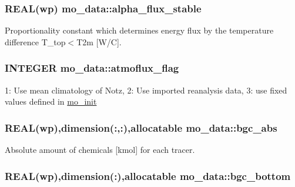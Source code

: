 \hypertarget{namespacemo__data_a5d103f2250083f57def04a08d89be231}{
\subsubsection[{alpha\_\-flux\_\-stable}]{\setlength{\rightskip}{0pt plus 5cm}REAL(wp) {\bf mo\_\-data::alpha\_\-flux\_\-stable}}}
\label{namespacemo__data_a5d103f2250083f57def04a08d89be231}


Proportionality constant which determines energy flux by the temperature difference T\_\-top$<$T2m \mbox{[}W/C\mbox{]}. 

\hypertarget{namespacemo__data_ac3bc82dac4d101806cd2a77f3b23d92c}{
\subsubsection[{atmoflux\_\-flag}]{\setlength{\rightskip}{0pt plus 5cm}INTEGER {\bf mo\_\-data::atmoflux\_\-flag}}}
\label{namespacemo__data_ac3bc82dac4d101806cd2a77f3b23d92c}


1: Use mean climatology of Notz, 2: Use imported reanalysis data, 3: use fixed values defined in \hyperlink{namespacemo__init}{mo\_\-init} 

\hypertarget{namespacemo__data_a0f5cfd95b789313c0a78a9b7feae167a}{
\subsubsection[{bgc\_\-abs}]{\setlength{\rightskip}{0pt plus 5cm}REAL(wp),dimension(:,:),allocatable {\bf mo\_\-data::bgc\_\-abs}}}
\label{namespacemo__data_a0f5cfd95b789313c0a78a9b7feae167a}


Absolute amount of chemicals \mbox{[}kmol\mbox{]} for each tracer. 

\hypertarget{namespacemo__data_a7a31686a7563ca77bbe2aa8eaa14cfd2}{
\subsubsection[{bgc\_\-bottom}]{\setlength{\rightskip}{0pt plus 5cm}REAL(wp),dimension(:),allocatable {\bf mo\_\-data::bgc\_\-bottom}}}
\label{namespacemo__data_a7a31686a7563ca77bbe2aa8eaa14cfd2}


